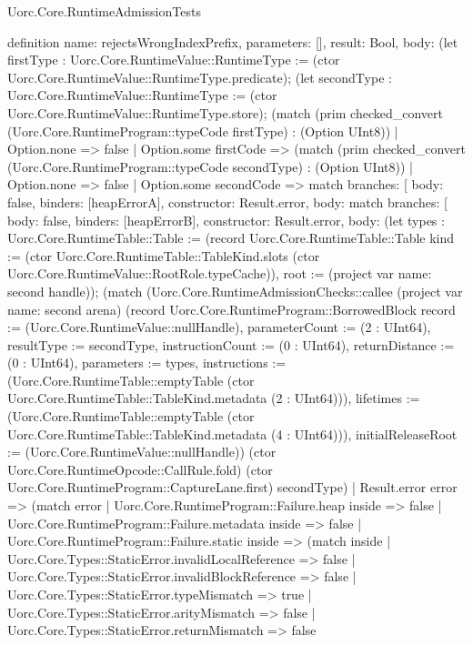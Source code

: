 \begin{lexlean}{Uorc.Core.RuntimeAdmissionTests}
\begin{semanticmodule}
definition{
  name: rejectsWrongIndexPrefix,
  parameters: [],
  result: Bool,
  body: (let firstType : Uorc.Core.RuntimeValue::RuntimeType := (ctor Uorc.Core.RuntimeValue::RuntimeType.predicate); (let secondType : Uorc.Core.RuntimeValue::RuntimeType := (ctor Uorc.Core.RuntimeValue::RuntimeType.store); (match (prim checked_convert (Uorc.Core.RuntimeProgram::typeCode firstType) : (Option UInt8))
    | Option.none => false
    | Option.some firstCode => (match (prim checked_convert (Uorc.Core.RuntimeProgram::typeCode secondType) : (Option UInt8))
      | Option.none => false
      | Option.some secondCode => match{
        branches: [
          {body: false, binders: [heapErrorA], constructor: Result.error},
          {
            body: match{
              branches: [
                {body: false, binders: [heapErrorB], constructor: Result.error},
                {
                  body: (let types : Uorc.Core.RuntimeTable::Table := (record Uorc.Core.RuntimeTable::Table {kind := (ctor Uorc.Core.RuntimeTable::TableKind.slots (ctor Uorc.Core.RuntimeValue::RootRole.typeCache)), root := (project var{
                    name: second
                  } handle)}); (match (Uorc.Core.RuntimeAdmissionChecks::callee (project var{
                      name: second
                    } arena) (record Uorc.Core.RuntimeProgram::BorrowedBlock {record := (Uorc.Core.RuntimeValue::nullHandle), parameterCount := (2 : UInt64), resultType := secondType, instructionCount := (0 : UInt64), returnDistance := (0 : UInt64), parameters := types, instructions := (Uorc.Core.RuntimeTable::emptyTable (ctor Uorc.Core.RuntimeTable::TableKind.metadata (2 : UInt64))), lifetimes := (Uorc.Core.RuntimeTable::emptyTable (ctor Uorc.Core.RuntimeTable::TableKind.metadata (4 : UInt64))), initialReleaseRoot := (Uorc.Core.RuntimeValue::nullHandle)}) (ctor Uorc.Core.RuntimeOpcode::CallRule.fold) (ctor Uorc.Core.RuntimeProgram::CaptureLane.first) secondType)
                    | Result.error error => (match error
                      | Uorc.Core.RuntimeProgram::Failure.heap inside => false
                      | Uorc.Core.RuntimeProgram::Failure.metadata inside => false
                      | Uorc.Core.RuntimeProgram::Failure.static inside => (match inside
                        | Uorc.Core.Types::StaticError.invalidLocalReference => false
                        | Uorc.Core.Types::StaticError.invalidBlockReference => false
                        | Uorc.Core.Types::StaticError.typeMismatch => true
                        | Uorc.Core.Types::StaticError.arityMismatch => false
                        | Uorc.Core.Types::StaticError.returnMismatch => false
}}}}}
\end{semanticmodule}
\end{lexlean}
